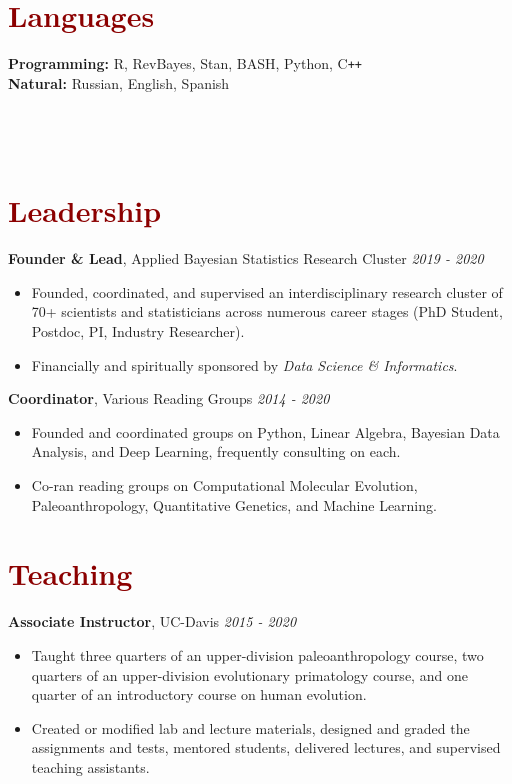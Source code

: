 \documentclass[11pt,margin,line]{resume}
\begin{document}
\begin{resume}
\section{\large\textcolor{DarkRed}{Languages}}

\textbf{Programming:} R, RevBayes, Stan, BASH, Python, C\texttt{++}\\
\textbf{Natural:} Russian, English, Spanish\\\\\\\\


\section{\large\textcolor{DarkRed}{Leadership}}

\textbf{Founder \& Lead}, Applied Bayesian Statistics Research Cluster \hfill \emph{2019 - 2020}
\begin{itemize}[noitemsep]
\item Founded, coordinated, and supervised an interdisciplinary research cluster of 70+ scientists and statisticians across numerous career stages (PhD Student, Postdoc, PI, Industry Researcher). \item Financially and spiritually sponsored by \emph{Data Science \& Informatics}.
\end{itemize} 
\vspace{-1.5mm}

\textbf{Coordinator}, Various Reading Groups \hfill \emph{2014 - 2020}
\begin{itemize}[noitemsep]
\item Founded and coordinated groups on Python, Linear Algebra, Bayesian Data Analysis, and Deep Learning, frequently consulting on each. 
\item Co-ran reading groups on Computational Molecular Evolution, Paleoanthropology, Quantitative Genetics, and Machine Learning.
\end{itemize} 
\vspace{-1.5mm}

\section{\large\textcolor{DarkRed}{Teaching}}

\textbf{Associate Instructor}, UC-Davis \hfill \emph{2015  - 2020}
\begin{itemize}[noitemsep]
\item Taught three quarters of an upper-division paleoanthropology course, two quarters of an upper-division evolutionary primatology course, and one quarter of an introductory course on human evolution. 
\item Created or modified lab and lecture materials, designed and graded the assignments and tests, mentored students, delivered lectures, and supervised teaching assistants.
\end{itemize} 
\vspace{-1.5mm}


\end{resume}
\end{document}
